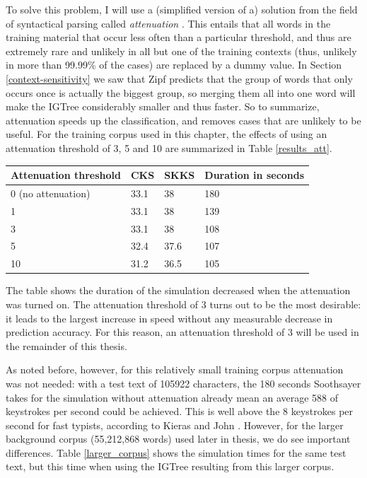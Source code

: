 \documentclass[11pt]{article}
\let\originaltable\table
\let\endoriginaltable\endtable
\renewenvironment{table}[1][ht]{%
  \originaltable[#1]
  \centering}%
  {\endoriginaltable}
\begin{document}
To solve this problem, I will use a (simplified version of a) solution from the field of syntactical parsing called \emph{attenuation} \cite{eisner96}. This entails that all words in the training material that occur less often than a particular threshold, and thus are extremely rare and unlikely in all but one of the training contexts (thus, unlikely in more than 99.99\% of the cases) are replaced by a dummy value. In Section \ref{context-sensitivity} we saw that Zipf predicts that the group of words that only occurs once is actually the biggest group, so merging them all into one word will make the IGTree considerably smaller and thus faster. So to summarize, attenuation speeds up the classification, and removes cases that are unlikely to be useful. For the training corpus used in this chapter, the effects of using an attenuation threshold of 3, 5 and 10 are summarized in Table \ref{results_att}.

\begin{table}[h]
\begin{tabular}{l|lll} 

Attenuation threshold&CKS&SKKS&Duration in seconds\\
\hline
0 (no attenuation)&33.1&38&180\\
1&33.1&38&139\\
3&33.1&38&108\\
5&32.4&37.6&107\\
10&31.2&36.5&105\\
\end{tabular} 
\caption{Percentage of keystrokes saved and simulation times with 4 attenuation thresholds.} \label{results_att}
\end{table}

The table shows the duration of the simulation decreased when the attenuation was turned on. The attenuation threshold of 3 turns out to be the most desirable: it leads to the largest increase in speed without any measurable decrease in prediction accuracy. For this reason, an attenuation threshold of 3 will be used in the remainder of this thesis.

As noted before, however, for this relatively small training corpus attenuation was not needed: with a test text of 105922 characters, the 180 seconds Soothsayer takes for the simulation without attenuation already mean an average 588 of keystrokes per second could be achieved. This is well above the 8 keystrokes per second for fast typists, according to Kieras and John . However, for the larger background corpus (55,212,868 words) used later in thesis, we do see important differences. Table \ref{larger_corpus} shows the simulation times for the same test text, but this time when using the IGTree resulting from this larger corpus.
\end{document}
